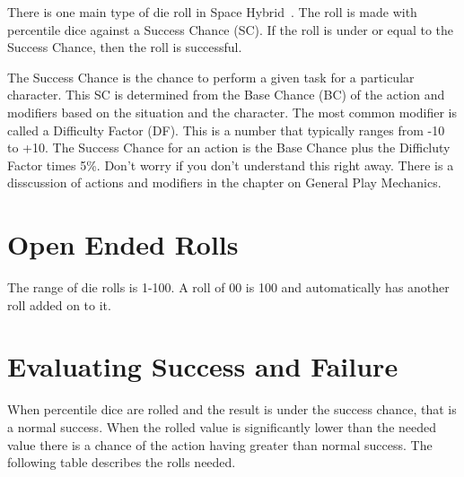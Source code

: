 There is one main type of die roll in Space Hybrid\ . The roll is 
made with percentile dice against a Success Chance (SC). If the roll 
is under or equal to the Success Chance, then the roll is successful.

The Success Chance is the chance to perform a given task for a particular
character. This SC is determined from the Base Chance (BC) of the action 
and modifiers based on the situation and the character. The most common 
modifier is called a Difficulty Factor (DF). This is a number that typically 
ranges from -10 to +10. The Success Chance for an action is the Base Chance plus 
the Difficluty Factor times 5\%. Don't worry if you don't understand this right away.
There is a disscussion of actions and modifiers in the chapter on General Play 
Mechanics.

\section{Open Ended Rolls}

The range of die rolls is 1-100. A roll of 00 is 100 and 
automatically has another roll added on to it.

\section{Evaluating Success and Failure}

When percentile dice are rolled and the result is under the success chance, that
is a normal success. When the rolled value is significantly lower than the needed 
value there is a chance of the action having greater than normal success. The following 
table describes the rolls needed.



\newpage


